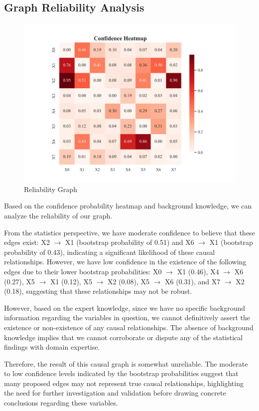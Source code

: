 \documentclass{article}
\begin{document}
\subsection{Graph Reliability Analysis}

\begin{figure}[H]
        \centering
        \vspace{-0.5cm}
        \includegraphics[width=0.8\linewidth]{postprocess/test_data/20241007_184921_base_nodes8_samples1500/output_graph/confidence_heatmap.jpg}
        \caption{Reliability Graph}
        \label{fig:sub3}
\end{figure}

Based on the confidence probability heatmap and background knowledge, we can analyze the reliability of our graph.

From the statistics perspective, we have moderate confidence to believe that these edges exist: X2 $\rightarrow$ X1 (bootstrap probability of 0.51) and X6 $\rightarrow$ X1 (bootstrap probability of 0.43), indicating a significant likelihood of these causal relationships. However, we have low confidence in the existence of the following edges due to their lower bootstrap probabilities: X0 $\rightarrow$ X1 (0.46), X4 $\rightarrow$ X6 (0.27), X5 $\rightarrow$ X1 (0.12), X5 $\rightarrow$ X2 (0.08), X5 $\rightarrow$ X6 (0.31), and X7 $\rightarrow$ X2 (0.18), suggesting that these relationships may not be robust.

However, based on the expert knowledge, since we have no specific background information regarding the variables in question, we cannot definitively assert the existence or non-existence of any causal relationships. The absence of background knowledge implies that we cannot corroborate or dispute any of the statistical findings with domain expertise.

Therefore, the result of this causal graph is somewhat unreliable. The moderate to low confidence levels indicated by the bootstrap probabilities suggest that many proposed edges may not represent true causal relationships, highlighting the need for further investigation and validation before drawing concrete conclusions regarding these variables.
\end{document}
